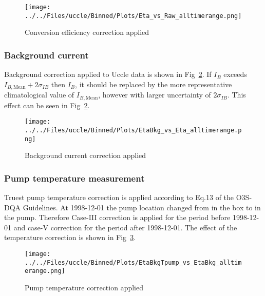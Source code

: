            \begin{figure}
        \centering
\texttt{[image: ../../Files/uccle/Binned/Plots/Eta\_vs\_Raw\_alltimerange.png]}
    \caption{Conversion efficiency correction applied}
            \label{fig:eta}
    \end{figure}


        \subsubsection{Background current}
        Background correction applied to Uccle data is shown in Fig~\ref{fig:bkg}. If $I_B$ exceeds $I_{B,\text{Mean}}+2\sigma_{IB}$ then $I_B$, it
should be replaced by the more representative climatological value of $I_{B,\text{Mean}}$, however with
larger uncertainty of $2\sigma_{IB}$. This effect can be seen in  Fig~\ref{fig:bkg}.

                \begin{figure}
        \centering
\texttt{[image: ../../Files/uccle/Binned/Plots/EtaBkg\_vs\_Eta\_alltimerange.png]}
    \caption{Background current correction applied}
            \label{fig:bkg}
    \end{figure}

           \subsubsection{Pump temperature measurement}
    Truest pump temperature correction is applied according to Eq.13 of the O3S-DQA Guidelines. At 1998-12-01 the pump location changed from in the box to in the pump.
    Therefore Case-III correction is applied for the period before 1998-12-01 and case-V correction for the period after 1998-12-01. The effect of the temperature correction
is shown in  Fig~\ref{fig:tpump}.


                    \begin{figure}
        \centering
\texttt{[image: ../../Files/uccle/Binned/Plots/EtaBkgTpump\_vs\_EtaBkg\_alltimerange.png]}
    \caption{Pump temperature correction applied}
            \label{fig:tpump}
    \end{figure}

